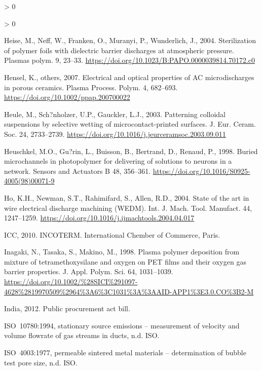 \documentclass[
  11pt,
  twoside]{article}
\newlength{\cslhangindent}
\newenvironment{CSLReferences}[2] %
 {%
  \setlength{\parindent}{0pt}
  \ifodd #1 \everypar{\setlength{\hangindent}{\cslhangindent}}\ignorespaces\fi
  \ifnum #2 > 0
  \setlength{\parskip}{#2\baselineskip}
  \fi
 }%
 {}
\begin{document}
\begin{CSLReferences}{1}{0}
\begin{CSLReferences}{1}{0}
\leavevmode\hypertarget{ref-Hei04}{}%
Heise, M., Neff, W., Franken, O., Muranyi, P., Wunderlich, J., 2004. Sterilization of polymer foils with dielectric barrier discharges at atmospheric pressure. Plasmas polym. 9, 23--33. \url{https://doi.org/10.1023/B:PAPO.0000039814.70172.c0}

\leavevmode\hypertarget{ref-Hens07}{}%
Hensel, K., others, 2007. Electrical and optical properties of {AC} microdischarges in porous ceramics. Plasma Process. Polym. 4, 682--693. \url{https://doi.org/10.1002/ppap.200700022}

\leavevmode\hypertarget{ref-Heul04}{}%
Heule, M., Sch?nholzer, U.P., Gauckler, L.J., 2003. Patterning colloidal suspensions by selective wetting of microcontact-printed surfaces. J. Eur. Ceram. Soc. 24, 2733--2739. \url{https://doi.org/10.1016/j.jeurceramsoc.2003.09.011}

\leavevmode\hypertarget{ref-Heusch1998}{}%
Heuschkel, M.O., Gu?rin, L., Buisson, B., Bertrand, D., Renaud, P., 1998. Buried microchannels in photopolymer for delivering of solutions to neurons in a network. Sensors and Actuators B 48, 356--361. \url{https://doi.org/10.1016/S0925-4005(98)00071-9}

\leavevmode\hypertarget{ref-Ho04}{}%
Ho, K.H., Newman, S.T., Rahimifard, S., Allen, R.D., 2004. State of the art in wire electrical discharge machining {(WEDM)}. Int. J. Mach. Tool. Manufact. 44, 1247--1259. \url{https://doi.org/10.1016/j.ijmachtools.2004.04.017}

\leavevmode\hypertarget{ref-incoterm2010}{}%
ICC, 2010. INCOTERM. International Chember of Commerce, Paris.

\leavevmode\hypertarget{ref-Inag1998}{}%
Inagaki, N., Tasaka, S., Makino, M., 1998. Plasma polymer deposition from mixture of tetramethoxysilane and oxygen on {PET} films and their oxygen gas barrier properties. J. Appl. Polym. Sci. 64, 1031--1039. \url{https://doi.org/10.1002/\%28SICI\%291097-4628\%2819970509\%2964\%3A6\%3C1031\%3A\%3AAID-APP1\%3E3.0.CO\%3B2-M}

\leavevmode\hypertarget{ref-publicprocurementact}{}%
India, 2012. Public procurement act bill.

\leavevmode\hypertarget{ref-ISO10780}{}%
{ISO}~10780:1994, stationary source emissions -- measurement of velocity and volume flowrate of gas streams in ducts, n.d. ISO.

\leavevmode\hypertarget{ref-ISO4003}{}%
{ISO}~4003:1977, permeable sintered metal materials -- determination of bubble test pore size, n.d. ISO.


\end{CSLReferences}
\end{CSLReferences}
\end{document}
